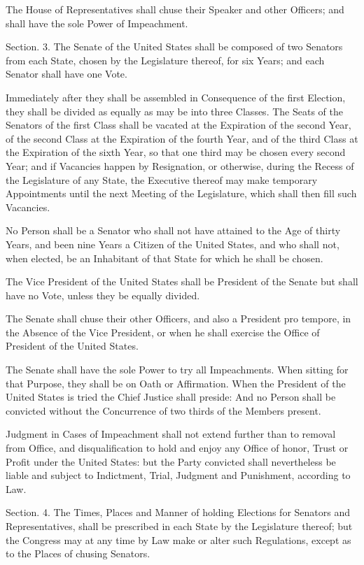 \documentclass{article}
\begin{document}
The House of Representatives shall chuse their Speaker and other
Officers; and shall have the sole Power of Impeachment.


Section. 3.  The Senate of the United States shall be composed of two
Senators from each State, chosen by the Legislature thereof, for six
Years; and each Senator shall have one Vote.

Immediately after they shall be assembled in Consequence of the first
Election, they shall be divided as equally as may be into three Classes.
The Seats of the Senators of the first Class shall be vacated at the
Expiration of the second Year, of the second Class at the Expiration of
the fourth Year, and of the third Class at the Expiration of the sixth
Year, so that one third may be chosen every second Year; and if
Vacancies happen by Resignation, or otherwise, during the Recess of the
Legislature of any State, the Executive thereof may make temporary
Appointments until the next Meeting of the Legislature, which shall then
fill such Vacancies.

No Person shall be a Senator who shall not have attained to the Age of
thirty Years, and been nine Years a Citizen of the United States, and
who shall not, when elected, be an Inhabitant of that State for which he
shall be chosen.

The Vice President of the United States shall be President of the Senate
but shall have no Vote, unless they be equally divided.

The Senate shall chuse their other Officers, and also a President pro
tempore, in the Absence of the Vice President, or when he shall exercise
the Office of President of the United States.

The Senate shall have the sole Power to try all Impeachments. When
sitting for that Purpose, they shall be on Oath or Affirmation. When the
President of the United States is tried the Chief Justice shall preside:
And no Person shall be convicted without the Concurrence of two thirds
of the Members present.

Judgment in Cases of Impeachment shall not extend further than to
removal from Office, and disqualification to hold and enjoy any Office
of honor, Trust or Profit under the United States: but the Party
convicted shall nevertheless be liable and subject to Indictment, Trial,
Judgment and Punishment, according to Law.

Section. 4.  The Times, Places and Manner of holding Elections for
Senators and Representatives, shall be prescribed in each State by the
Legislature thereof; but the Congress may at any time by Law make or
alter such Regulations, except as to the Places of chusing Senators.
\end{document}
